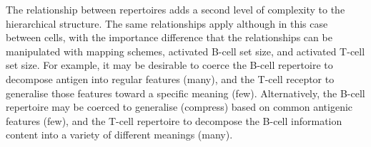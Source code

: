 The relationship between repertoires adds a second level of complexity to the hierarchical structure. The same relationships apply although in this case between cells, with the importance difference that the relationships can be manipulated with mapping schemes, activated B-cell set size, and activated T-cell set size.
For example, it may be desirable to coerce the B-cell repertoire to decompose antigen into regular features (many), and the T-cell receptor to generalise those features toward a specific meaning (few). Alternatively, the B-cell repertoire may be coerced to generalise (compress) based on common antigenic features (few), and the T-cell repertoire to decompose the B-cell information content into a variety of different meanings (many).

\begin{figure}[htp]
	\hfill
\end{figure}
